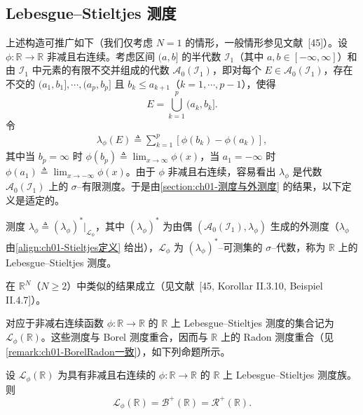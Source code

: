 \documentclass[../../main.tex]{subfiles}%
\begin{document}
\subsection{Lebesgue--Stieltjes 测度}\label{subsection:ch01-Stieltjes}

上述构造可推广如下（我们仅考虑 $N=1$ 的情形，一般情形参见文献~[45]）。设 $\phi:\mathbb{R}\to\mathbb{R}$ 非减且右连续。考虑区间 $(a,b]$ 的半代数 $\mathcal{I}_1$（其中 $a,b\in[-\infty,\infty]$）和由 $\mathcal{I}_1$ 中元素的有限不交并组成的代数 $\mathcal{A}_0(\mathcal{I}_1)$，即对每个 $E\in\mathcal{A}_0(\mathcal{I}_1)$，存在不交的 $(a_1,b_1],\cdots ,(a_p,b_p]$ 且 $b_k\leqslant a_{k+1}$（$k=1,\cdots ,p-1$），使得
\[
E=\bigcup_{k=1}^p(a_k,b_k].
\]
令
\begin{align}
\lambda_\phi(E)\triangleq \sum_{k=1}^p[\phi(b_k)-\phi(a_k)], \label{align:ch01-Stieltjes定义}
\end{align}
其中当 $b_p=\infty$ 时 $\phi(b_p)\triangleq \lim_{x\to\infty}\phi(x)$，当 $a_1=-\infty$ 时 $\phi(a_1)\triangleq \lim_{x\to-\infty}\phi(x)$。由于 $\phi$ 非减且右连续，容易看出 $\lambda_\phi$ 是代数 $\mathcal{A}_0(\mathcal{I}_1)$ 上的 $\sigma$--有限测度。于是由\cref{section:ch01-测度与外测度} 的结果，以下定义是适定的。

\begin{definition}\label{definition:ch01-Stieltjes测度}
测度 $\lambda_\phi\triangleq (\lambda_\phi)^*|_{\mathcal{L}_\phi}$，其中 $(\lambda_\phi)^*$ 为由偶 $(\mathcal{A}_0(\mathcal{I}_1),\lambda_\phi)$ 生成的外测度（$\lambda_\phi$ 由\eqref{align:ch01-Stieltjes定义} 给出），$\mathcal{L}_\phi$ 为 $(\lambda_\phi)^*$--可测集的 $\sigma$--代数，称为 $\mathbb{R}$ 上的 Lebesgue--Stieltjes 测度。
\end{definition}

在 $\mathbb{R}^N$（$N\geqslant 2$）中类似的结果成立（见文献~[45, Korollar II.3.10, Beispiel II.4.7]）。

对应于非减右连续函数 $\phi:\mathbb{R}\to\mathbb{R}$ 的 $\mathbb{R}$ 上 Lebesgue--Stieltjes 测度的集合记为 $\mathcal{L}_\phi(\mathbb{R})$。这些测度与 Borel 测度重合，因而与 $\mathbb{R}$ 上的 Radon 测度重合（见\cref{remark:ch01-BorelRadon一致}），如下列命题所示。

\begin{proposition}\label{proposition:ch01-Stieltjes等于Radon}
设 $\mathcal{L}_\phi(\mathbb{R})$ 为具有非减且右连续的 $\phi:\mathbb{R}\to\mathbb{R}$ 的 $\mathbb{R}$ 上 Lebesgue--Stieltjes 测度族。则
\[
\mathcal{L}_\phi(\mathbb{R})=\mathcal{B}^+(\mathbb{R})=\mathcal{R}^+(\mathbb{R}).
\]
\end{proposition}
\end{document}
